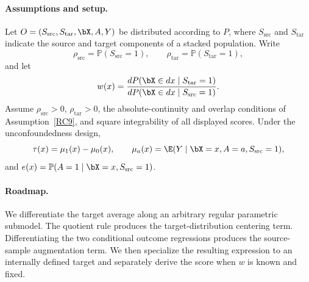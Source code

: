 \documentclass{article}
\renewcommand{\P}{\mathbb{P}}
\begin{document}
\paragraph{Assumptions and setup.}
Let $O=(S_{\mathrm{src}},S_{\mathrm{tar}},\bX,A,Y)$ be distributed according to $P$, where $S_{\mathrm{src}}$ and $S_{\mathrm{tar}}$ indicate the source and target components of a stacked population. Write
\[
\rho_{\mathrm{src}}=\P(S_{\mathrm{src}}=1),
\qquad
\rho_{\mathrm{tar}}=\P(S_{\mathrm{tar}}=1),
\]
and let
\[
w(x)
=
\frac{dP(\bX\in dx\mid S_{\mathrm{tar}}=1)}
     {dP(\bX\in dx\mid S_{\mathrm{src}}=1)}.
\]
Assume $\rho_{\mathrm{src}}>0$, $\rho_{\mathrm{tar}}>0$, the absolute-continuity and overlap conditions of Assumption~\ref{RC9}, and square integrability of all displayed scores. Under the unconfoundedness design,
\[
\tau(x)=\mu_1(x)-\mu_0(x),
\qquad
\mu_a(x)=\E(Y\mid\bX=x,A=a,S_{\mathrm{src}}=1),
\]
and $e(x)=\P(A=1\mid\bX=x,S_{\mathrm{src}}=1)$.

\paragraph{Roadmap.}
We differentiate the target average along an arbitrary regular parametric submodel. The quotient rule produces the target-distribution centering term. Differentiating the two conditional outcome regressions produces the source-sample augmentation term. We then specialize the resulting expression to an internally defined target and separately derive the score when $w$ is known and fixed.
\end{document}
